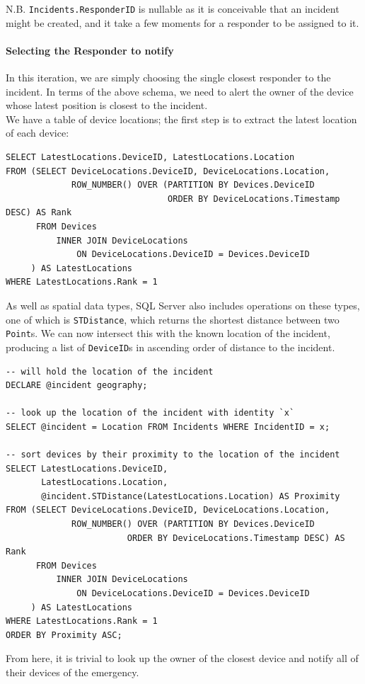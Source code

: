 \documentclass{article}
\begin{document}
N.B. \texttt{\color{OliveGreen}Incidents.ResponderID} is nullable as it is conceivable that an incident might be created, and it take a few moments for a responder to be assigned to it.\\

\paragraph{Selecting the Responder to notify}
In this iteration, we are simply choosing the single closest responder to the incident. In terms of the above schema, we need to alert the owner of the device whose latest position is closest to the incident.\\

We have a table of device locations; the first step is to extract the latest location of each device:
\lstset{language=SQL}
\begin{lstlisting}
SELECT LatestLocations.DeviceID, LatestLocations.Location
FROM (SELECT DeviceLocations.DeviceID, DeviceLocations.Location,
             ROW_NUMBER() OVER (PARTITION BY Devices.DeviceID
                                ORDER BY DeviceLocations.Timestamp DESC) AS Rank
      FROM Devices
	      INNER JOIN DeviceLocations
	          ON DeviceLocations.DeviceID = Devices.DeviceID
	 ) AS LatestLocations
WHERE LatestLocations.Rank = 1
\end{lstlisting}
\lstset{language=XML}
As well as spatial data types, SQL Server also includes operations on these types, one of which is \texttt{\color{OliveGreen}STDistance}, which returns the shortest distance between two \texttt{\color{OliveGreen}Point}s. We can now intersect this with the known location of the incident, producing a list of \texttt{\color{OliveGreen}DeviceID}s in ascending order of distance to the incident.
\lstset{language=SQL}
\begin{lstlisting}
-- will hold the location of the incident
DECLARE @incident geography;

-- look up the location of the incident with identity `x`
SELECT @incident = Location FROM Incidents WHERE IncidentID = x;

-- sort devices by their proximity to the location of the incident
SELECT LatestLocations.DeviceID,
       LatestLocations.Location,
       @incident.STDistance(LatestLocations.Location) AS Proximity
FROM (SELECT DeviceLocations.DeviceID, DeviceLocations.Location,
             ROW_NUMBER() OVER (PARTITION BY Devices.DeviceID
			            ORDER BY DeviceLocations.Timestamp DESC) AS Rank
      FROM Devices
	      INNER JOIN DeviceLocations
	          ON DeviceLocations.DeviceID = Devices.DeviceID
	 ) AS LatestLocations
WHERE LatestLocations.Rank = 1
ORDER BY Proximity ASC;
\end{lstlisting}
\lstset{language=XML}
From here, it is trivial to look up the owner of the closest device and notify all of their devices of the emergency.\\
\end{document}
